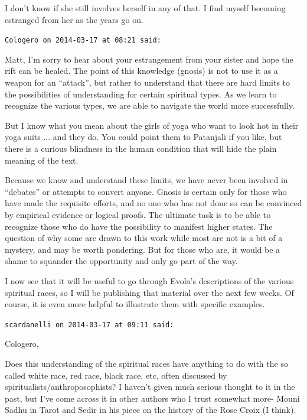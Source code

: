 \begin{footnotesize}
\begin{sffamily}
I don't know if she still involves herself in any of that. I find myself becoming estranged from her as the years go on.

\hfill

\texttt{Cologero on 2014-03-17 at 08:21 said:}

Matt, I'm sorry to hear about your estrangement from your sister and hope the rift can be healed. The point of this knowledge (gnosis) is not to use it as a weapon for an ``attack'', but rather to understand that there are hard limits to the possibilities of understanding for certain spiritual types. As we learn to recognize the various types, we are able to navigate the world more successfully.

But I know what you mean about the girls of yoga who want to look hot in their yoga suits ... and they do. You could point them to Patanjali if you like, but there is a curious blindness in the human condition that will hide the plain meaning of the text.

Because we know and understand these limits, we have never been involved in ``debates'' or attempts to convert anyone. Gnosis is certain only for those who have made the requisite efforts, and no one who has not done so can be convinced by empirical evidence or logical proofs. The ultimate task is to be able to recognize those who do have the possibility to manifest higher states. The question of why some are drawn to this work while most are not is a bit of a mystery, and may be worth pondering. But for those who are, it would be a shame to squander the opportunity and only go part of the way.

I now see that it will be useful to go through Evola's descriptions of the various spiritual races, so I will be publishing that material over the next few weeks. Of course, it is even more helpful to illustrate them with specific examples.

\hfill

\texttt{scardanelli on 2014-03-17 at 09:11 said:}

Cologero,

Does this understanding of the spiritual races have anything to do with the so called white race, red race, black race, etc, often discussed by spiritualists/anthroposophists? I haven't given much serious thought to it in the past, but I've come across it in other authors who I trust somewhat more- Mouni Sadhu in Tarot and Sedir in his piece on the history of the Rose Croix (I think).

\hfill


\end{sffamily}
\end{footnotesize}

